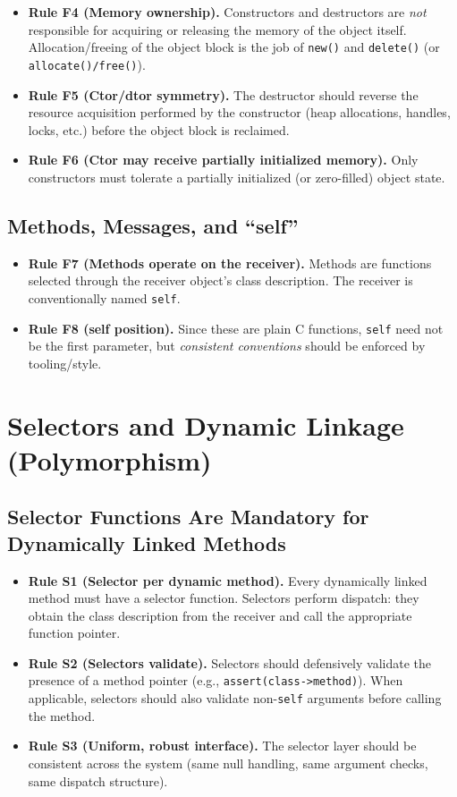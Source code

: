 \documentclass[11pt]{article}
\begin{document}
\begin{itemize}
  \item \textbf{Rule F4 (Memory ownership).} Constructors and destructors are \emph{not} responsible for acquiring or releasing the memory of the object itself. Allocation/freeing of the object block is the job of \texttt{new()} and \texttt{delete()} (or \texttt{allocate()/free()}).
  \item \textbf{Rule F5 (Ctor/dtor symmetry).} The destructor should reverse the resource acquisition performed by the constructor (heap allocations, handles, locks, etc.) before the object block is reclaimed.
  \item \textbf{Rule F6 (Ctor may receive partially initialized memory).} Only constructors must tolerate a partially initialized (or zero-filled) object state.
\end{itemize}

\subsection{Methods, Messages, and ``self''}

\begin{itemize}
  \item \textbf{Rule F7 (Methods operate on the receiver).} Methods are functions selected through the receiver object's class description. The receiver is conventionally named \texttt{self}.
  \item \textbf{Rule F8 (self position).} Since these are plain C functions, \texttt{self} need not be the first parameter, but \emph{consistent conventions} should be enforced by tooling/style.
\end{itemize}

\section{Selectors and Dynamic Linkage (Polymorphism)}

\subsection{Selector Functions Are Mandatory for Dynamically Linked Methods}

\begin{itemize}
  \item \textbf{Rule S1 (Selector per dynamic method).} Every dynamically linked method must have a selector function. Selectors perform dispatch: they obtain the class description from the receiver and call the appropriate function pointer.
  \item \textbf{Rule S2 (Selectors validate).} Selectors should defensively validate the presence of a method pointer (e.g., \texttt{assert(class->method)}). When applicable, selectors should also validate non-\texttt{self} arguments before calling the method.
  \item \textbf{Rule S3 (Uniform, robust interface).} The selector layer should be consistent across the system (same null handling, same argument checks, same dispatch structure).
\end{itemize}
\end{document}
